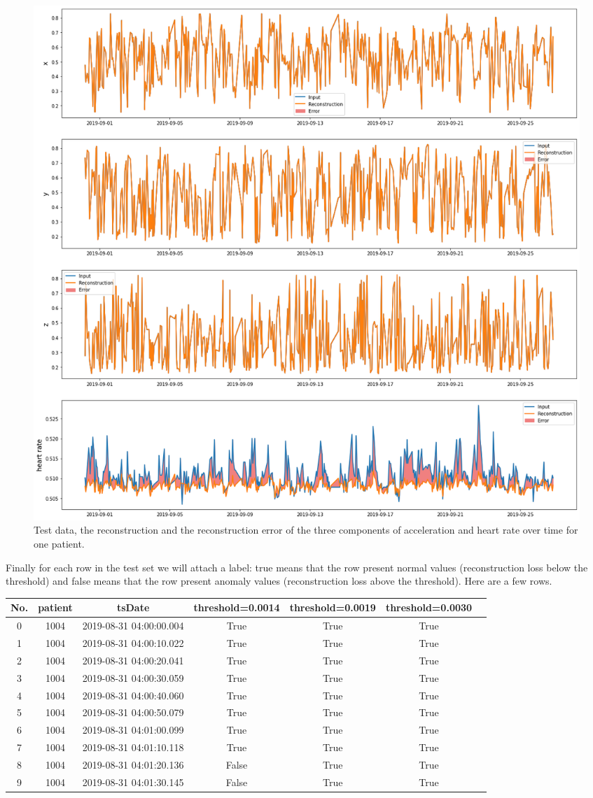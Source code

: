 \begin{figure}[H]
\centering
  \includegraphics[scale=0.35]{img/task_2/reconstructions_test.png}
  \caption{Test data, the reconstruction and the reconstruction error of the three components of acceleration and heart rate over time for one patient.}
  \label{fig: rec test}
\end{figure}

Finally for each row in the test set we will attach a label: true means that the row present normal values (reconstruction loss below the threshold) and false means that the row present anomaly values (reconstruction loss above the threshold). Here are a few rows.

\begin{center}
\begin{tabular}{| c | c | c | c | c | c | c |} 
\hline
No. & patient & tsDate & threshold=0.0014 & threshold=0.0019 & threshold=0.0030 \\ [0.5ex] 
\hline
\hline
0 &	1004 & 2019-08-31 04:00:00.004 & True & True & True \\
\hline
1 &	1004 & 2019-08-31 04:00:10.022 & True & True & True \\
\hline
2 &	1004 & 2019-08-31 04:00:20.041 & True & True & True \\
\hline
3 &	1004 & 2019-08-31 04:00:30.059 & True & True & True \\
\hline
4 &	1004 & 2019-08-31 04:00:40.060 & True & True & True \\
\hline
5 &	1004 & 2019-08-31 04:00:50.079 & True & True & True \\
\hline
6 &	1004 & 2019-08-31 04:01:00.099 & True & True & True \\
\hline
7 &	1004 & 2019-08-31 04:01:10.118 & True & True & True \\
\hline
8 &	1004 & 2019-08-31 04:01:20.136 & False & True & True \\
\hline
9 &	1004& 2019-08-31 04:01:30.145 & False & True & True \\ [1ex] 
\hline
\end{tabular}
\end{center}
